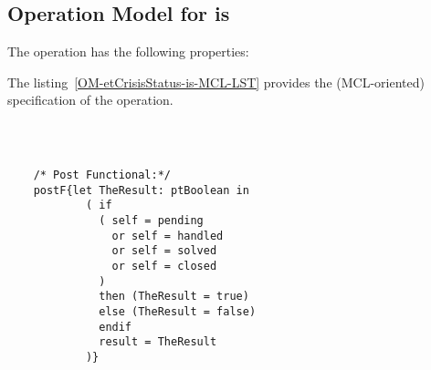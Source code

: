 \subsection{Operation Model for is}

\label{OM-is}


The  operation has the following properties:

	\begin{operationmodel}



		


	\end{operationmodel}



	\vspace{1cm}
	The listing~\ref{OM-etCrisisStatus-is-MCL-LST} provides the \msrmessir (MCL-oriented) specification of the operation.
	
	\scriptsize
	\vspace{0.5cm}
	\begin{lstlisting}[style=MessirStyle,firstnumber=auto,captionpos=b,caption={\msrmessir (MCL-oriented) specification of the operation \emph{is}.},label=OM-etCrisisStatus-is-MCL-LST]

	
	
	/* Post Functional:*/ 
	postF{let TheResult: ptBoolean in
	        ( if
	          ( self = pending
	            or self = handled
	            or self = solved
	            or self = closed
	          )
	          then (TheResult = true)
	          else (TheResult = false)
	          endif
	          result = TheResult
	        )}
	
	
	\end{lstlisting}
	\normalsize 
	
	
	
	





